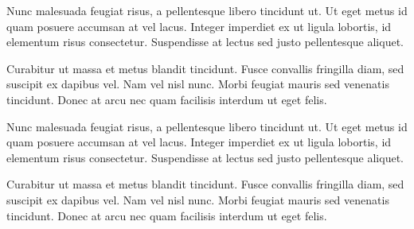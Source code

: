 Nunc malesuada feugiat risus, a pellentesque libero tincidunt ut. Ut eget metus id quam posuere accumsan at vel lacus. Integer imperdiet ex ut ligula lobortis, id elementum risus consectetur. Suspendisse at lectus sed justo pellentesque aliquet.

Curabitur ut massa et metus blandit tincidunt. Fusce convallis fringilla diam, sed suscipit ex dapibus vel. Nam vel nisl nunc. Morbi feugiat mauris sed venenatis tincidunt. Donec at arcu nec quam facilisis interdum ut eget felis.

Nunc malesuada feugiat risus, a pellentesque libero tincidunt ut. Ut eget metus id quam posuere accumsan at vel lacus. Integer imperdiet ex ut ligula lobortis, id elementum risus consectetur. Suspendisse at lectus sed justo pellentesque aliquet.

Curabitur ut massa et metus blandit tincidunt. Fusce convallis fringilla diam, sed suscipit ex dapibus vel. Nam vel nisl nunc. Morbi feugiat mauris sed venenatis tincidunt. Donec at arcu nec quam facilisis interdum ut eget felis.

